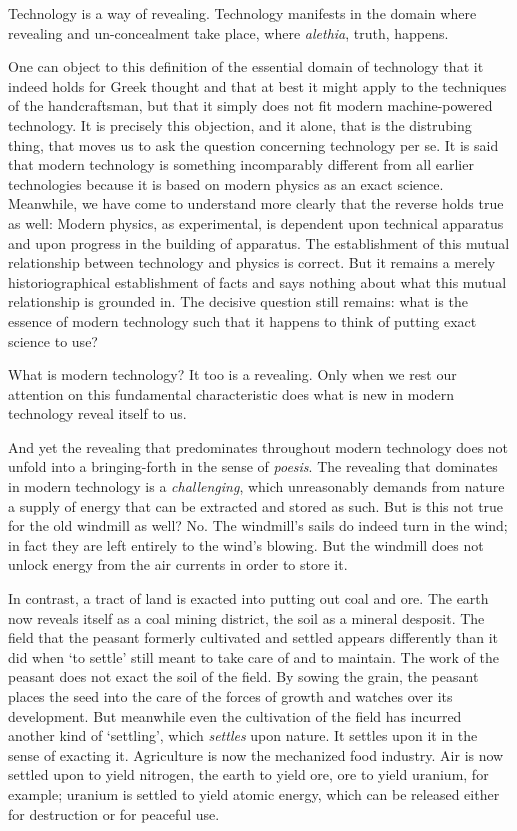 \documentclass[paper=a4, fontsize=11pt,twoside]{scrartcl}
\begin{document}
Technology is a way of revealing. Technology manifests in the domain where revealing and un-concealment take place, where \textit{al{\-e}thia}, truth, happens.

One can object to this definition of the essential domain of technology that it indeed holds for Greek thought and that at best it might apply to the techniques of the handcraftsman, but that it simply does not fit modern machine-powered technology. It is precisely this objection, and it alone, that is the distrubing thing, that moves us to ask the question concerning technology per se. It is said that modern technology is something incomparably different from all earlier technologies because it is based on modern physics as an exact science. Meanwhile, we have come to understand more clearly that the reverse holds true as well: Modern physics, as experimental, is dependent upon technical apparatus and upon progress in the building of apparatus. The establishment of this mutual relationship between technology and physics is correct. But it remains a merely historiographical establishment of facts and says nothing about what this mutual relationship is grounded in. The decisive question still remains: what is the essence of modern technology such that it happens to think of putting exact science to use?

What is modern technology? It too is a revealing. Only when we rest our attention on this fundamental characteristic does what is new in modern technology reveal itself to us. 

And yet the revealing that predominates throughout modern technology does not unfold into a bringing-forth in the sense of \textit{po{\-e}sis}. The revealing that dominates in modern technology is a \textit{challenging}, which unreasonably demands from nature a supply of energy that can be extracted and stored as such. But is this not true for the old windmill as well? No. The windmill's sails do indeed turn in the wind; in fact they are left entirely to the wind's blowing. But the windmill does not unlock energy from the air currents in order to store it.

In contrast, a tract of land is exacted into putting out coal and ore. The earth now reveals itself as a coal mining district, the soil as a mineral desposit. The field that the peasant formerly cultivated and settled appears differently than it did when `to settle' still meant to take care of and to maintain. The work of the peasant does not exact the soil of the field. By sowing the grain, the peasant places the seed into the care of the forces of growth and watches over its development. But meanwhile even the cultivation of the field has incurred another kind of `settling', which \textit{settles} upon nature. It settles upon it in the sense of exacting it. Agriculture is now the mechanized food industry. Air is now settled upon to yield nitrogen, the earth to yield ore, ore to yield uranium, for example; uranium is settled to yield atomic energy, which can be released either for destruction or for peaceful use.
\end{document}
